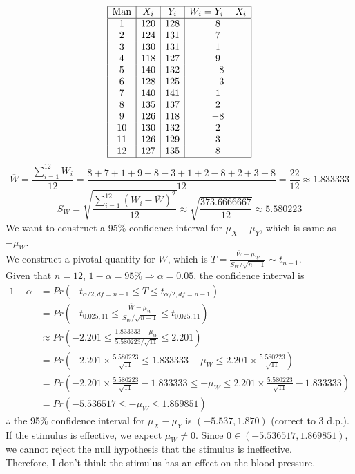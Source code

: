 \documentclass{article}
\begin{document}
\[
\begin{array}{|c|c|c|c|}
\hline
\text{Man} & X_i & Y_i & W_i = Y_i - X_i \\
\hline
1 & 120 & 128 & 8 \\
2 & 124 & 131 & 7 \\
3 & 130 & 131 & 1 \\
4 & 118 & 127 & 9 \\
5 & 140 & 132 & -8 \\
6 & 128 & 125 & -3 \\
7 & 140 & 141 & 1 \\
8 & 135 & 137 & 2 \\
9 & 126 & 118 & -8 \\
10 & 130 & 132 & 2 \\
11 & 126 & 129 & 3 \\
12 & 127 & 135 & 8 \\
\hline
\end{array}
\]
\[
\overline{W} = \frac{\sum_{i=1}^{12} W_i}{12} = \frac{8 + 7 + 1 + 9 - 8 - 3 + 1 + 2 - 8 + 2 + 3 + 8}{12} = \frac{22}{12} \approx 1.833333
\]
\[
S_W = \sqrt{\frac{\sum_{i=1}^{12} (W_i - \overline{W})^2}{12}} \approx \sqrt{\frac{373.6666667}{12}} \approx 5.580223
\]
We want to construct a 95$\%$ confidence interval for $\mu_X - \mu_Y$, which is same as $-\mu_W$. \\
We construct a pivotal quantity for $W$, which is $T = \frac{\overline{W} - \mu_W}{S_W/\sqrt{n-1}} \sim t_{n-1}$. \\
Given that $n=12$, $1-\alpha=95\% \Rightarrow \alpha = 0.05$, the confidence interval is
\begin{align*}
1 - \alpha &= Pr(-t_{\alpha/2, df=n-1} \leq T \leq t_{\alpha/2, df=n-1}) \\
&= Pr(-t_{0.025, 11} \leq \frac{\overline{W} - \mu_W}{S_W/\sqrt{n-1}} \leq t_{0.025, 11}) \\
&\approx Pr(-2.201 \leq \frac{1.833333 - \mu_W}{5.580223/\sqrt{11}} \leq 2.201) \\
&= Pr(-2.201 \times \frac{5.580223}{\sqrt{11}} \leq 1.833333 - \mu_W \leq 2.201 \times \frac{5.580223}{\sqrt{11}}) \\
&= Pr(-2.201 \times \frac{5.580223}{\sqrt{11}} - 1.833333 \leq -\mu_W \leq 2.201 \times \frac{5.580223}{\sqrt{11}} - 1.833333) \\
&= Pr(-5.536517 \leq -\mu_W \leq 1.869851)
\end{align*}
$\therefore$ the 95$\%$ confidence interval for $\mu_X - \mu_Y$ is $(-5.537, 1.870)$ (correct to 3 d.p.). \\
If the stimulus is effective, we expect $\mu_W \neq 0$. Since $0 \in (-5.536517, 1.869851)$, we cannot reject the null hypothesis that the stimulus is ineffective. \\
Therefore, I don't think the stimulus has an effect on the blood pressure.
\end{document}
